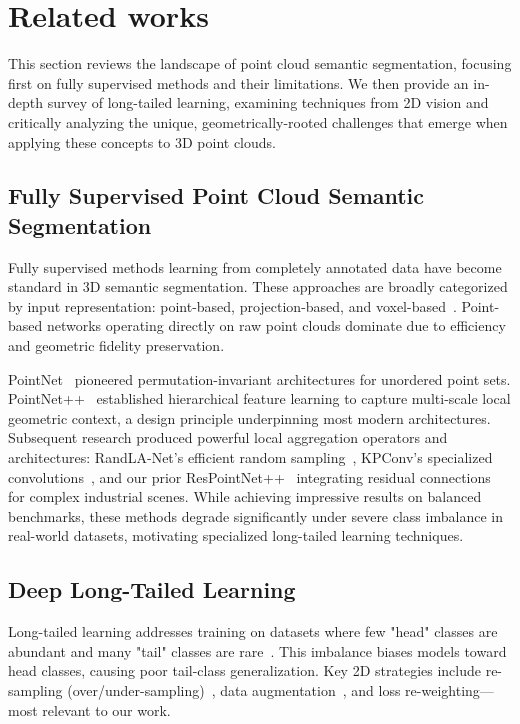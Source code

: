 \documentclass[preprint,12pt]{elsarticle}
\begin{document}
\section{Related works}
\label{sec:related_works}
This section reviews the landscape of point cloud semantic segmentation, focusing first on fully supervised methods and their limitations. We then provide an in-depth survey of long-tailed learning, examining techniques from 2D vision and critically analyzing the unique, geometrically-rooted challenges that emerge when applying these concepts to 3D point clouds.

\subsection{Fully Supervised Point Cloud Semantic Segmentation}
\label{sec:fully_supervised}
Fully supervised methods learning from completely annotated data have become standard in 3D semantic segmentation. These approaches are broadly categorized by input representation: point-based, projection-based, and voxel-based~\cite{guo2020deep}. Point-based networks operating directly on raw point clouds dominate due to efficiency and geometric fidelity preservation.

PointNet~\cite{qi2017pointnet} pioneered permutation-invariant architectures for unordered point sets. PointNet++~\cite{qi2017pointnetpp} established hierarchical feature learning to capture multi-scale local geometric context, a design principle underpinning most modern architectures. Subsequent research produced powerful local aggregation operators and architectures: RandLA-Net's efficient random sampling~\cite{hu2020randlanet}, KPConv's specialized convolutions~\cite{thomas2019kpconv}, and our prior ResPointNet++~\cite{respointnet} integrating residual connections for complex industrial scenes. While achieving impressive results on balanced benchmarks, these methods degrade significantly under severe class imbalance in real-world datasets, motivating specialized long-tailed learning techniques.

\subsection{Deep Long-Tailed Learning}
\label{sec:long_tailed}
Long-tailed learning addresses training on datasets where few "head" classes are abundant and many "tail" classes are rare~\cite{zhang2021deep}. This imbalance biases models toward head classes, causing poor tail-class generalization. Key 2D strategies include re-sampling (over/under-sampling)~\cite{buda2018systematic}, data augmentation~\cite{zhang2018mixup}, and loss re-weighting—most relevant to our work.
\end{document}

